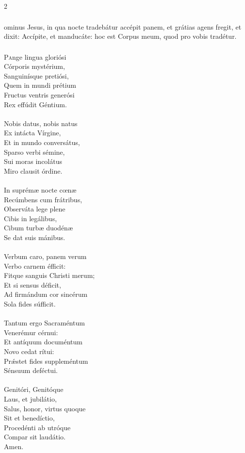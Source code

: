 \documentclass[9pt,twoside]{extarticle}
\begin{document}
\begin{multicols}{2}
\subsubsection*{}
ominus Jesus, in qua nocte tradebátur accépit panem, et grátias agens fregit, et dixit: Accípite, et manducáte: hoc est Corpus meum, quod pro vobis tradétur.

\subsubsection*{\center{}}
\lettrine{P}ange lingua gloriósi\\ 
Córporis mystérium,\\ 
Sanguinísque pretiósi,\\ 
Quem in mundi prétium\\ 
Fructus ventris generósi\\ 
Rex effúdit Géntium.\\ 
\\
Nobis datus, nobis natus\\ 
Ex intácta Vírgine,\\ 
Et in mundo conversátus,\\ 
Sparso verbi sémine,\\ 
Sui moras incolátus\\ 
Miro clausit órdine.\\ 
\\
In suprémæ nocte cœnæ\\ 
Recúmbens cum frátribus,\\ 
Observáta lege plene\\ 
Cibis in legálibus,\\ 
Cibum turbæ duodénæ\\ 
Se dat suis mánibus.\\ 
\\
Verbum caro, panem verum\\ 
Verbo carnem éfficit:\\ 
Fitque sanguis Christi merum;\\ 
Et si sensus déficit,\\ 
Ad firmándum cor sincérum\\ 
Sola fides súfficit.\\ 
\\
Tantum ergo Sacraméntum\\ 
Venerémur cérnui:\\ 
Et antíquum documéntum\\ 
Novo cedat rítui:\\ 
Prǽstet fides suppleméntum\\ 
Sénsuum deféctui.\\ 
\\
Genitóri, Genitóque\\ 
Laus, et jubilátio,\\ 
Salus, honor, virtus quoque\\ 
Sit et benedíctio,\\ 
Procedénti ab utróque\\ 
Compar sit laudátio.\\
Amen.


\end{multicols}
\end{document}
